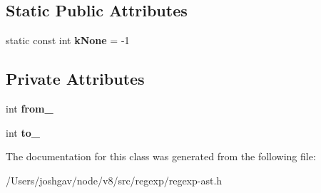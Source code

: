 \subsection*{Static Public Attributes}
\begin{DoxyCompactItemize}
\item 
static const int {\bfseries k\+None} = -\/1\hypertarget{classv8_1_1internal_1_1_interval_a2927ae1d5748bc5d2313327d78dec69e}{}\label{classv8_1_1internal_1_1_interval_a2927ae1d5748bc5d2313327d78dec69e}

\end{DoxyCompactItemize}
\subsection*{Private Attributes}
\begin{DoxyCompactItemize}
\item 
int {\bfseries from\+\_\+}\hypertarget{classv8_1_1internal_1_1_interval_af69600296681de9cf44cf4dc3e7464e3}{}\label{classv8_1_1internal_1_1_interval_af69600296681de9cf44cf4dc3e7464e3}

\item 
int {\bfseries to\+\_\+}\hypertarget{classv8_1_1internal_1_1_interval_a66a0e44731b063cc6c8383f3d629ac41}{}\label{classv8_1_1internal_1_1_interval_a66a0e44731b063cc6c8383f3d629ac41}

\end{DoxyCompactItemize}


The documentation for this class was generated from the following file\+:\begin{DoxyCompactItemize}
\item 
/\+Users/joshgav/node/v8/src/regexp/regexp-\/ast.\+h\end{DoxyCompactItemize}
